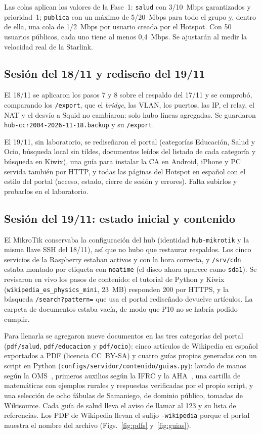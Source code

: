 \documentclass[conference]{IEEEtran}
\begin{document}
Las colas aplican los valores de la Fase~1: \texttt{salud} con 3/10~Mbps garantizados y prioridad~1; \texttt{publica} con un máximo de 5/20~Mbps para todo el grupo y, dentro de ella, una cola de 1/2~Mbps por usuario creada por el Hotspot. Con 50 usuarios públicos, cada uno tiene al menos 0,4~Mbps. Se ajustarán al medir la velocidad real de la Starlink.

\subsection{Sesión del 18/11 y rediseño del 19/11}
El 18/11 se aplicaron los pasos 7 y 8 sobre el respaldo del 17/11 y se comprobó, comparando los \texttt{/export}, que el \textit{bridge}, las VLAN, los puertos, las IP, el relay, el NAT y el desvío a Squid no cambiaron: solo hubo líneas agregadas. Se guardaron \texttt{hub-ccr2004-2026-11-18.backup} y su \texttt{/export}.

El 19/11, sin laboratorio, se rediseñaron el portal (categorías Educación, Salud y Ocio, búsqueda local sin tildes, documentos leídos del listado de cada categoría y búsqueda en Kiwix), una guía para instalar la CA en Android, iPhone y PC servida también por HTTP, y todas las páginas del Hotspot en español con el estilo del portal (acceso, estado, cierre de sesión y errores). Falta subirlos y probarlos en el laboratorio.

\subsection{Sesión del 19/11: estado inicial y contenido}
El MikroTik conservaba la configuración del hub (identidad \texttt{hub-mikrotik} y la misma llave SSH del 18/11), así que no hubo que restaurar respaldos. Los cinco servicios de la Raspberry estaban activos y con la hora correcta, y \texttt{/srv/cdn} estaba montado por etiqueta con \texttt{noatime} (el disco ahora aparece como \texttt{sda1}). Se revisaron en vivo los pasos de contenido: el tutorial de Python y Kiwix (\texttt{wikipedia\_es\_physics\_mini}, 23~MB) responden 200 por HTTPS, y la búsqueda \texttt{/search?pattern=} que usa el portal rediseñado devuelve artículos. La carpeta de documentos estaba vacía, de modo que P10 no se habría podido cumplir.

Para llenarla se agregaron nueve documentos en las tres categorías del portal (\texttt{pdf/salud}, \texttt{pdf/educacion} y \texttt{pdf/ocio}): cinco artículos de Wikipedia en español exportados a PDF (licencia CC~BY-SA) y cuatro guías propias generadas con un script en Python (\texttt{configs/servidor/contenido/guias.py}): lavado de manos según la OMS~\cite{who-hh}, primeros auxilios según la IFRC y la AHA~\cite{ifrc-fa}, una cartilla de matemáticas con ejemplos rurales y respuestas verificadas por el propio script, y una selección de ocho fábulas de Samaniego, de dominio público, tomadas de Wikisource. Cada guía de salud lleva el aviso de llamar al 123 y su lista de referencias. Los PDF de Wikipedia llevan el sufijo \texttt{-wikipedia} porque el portal muestra el nombre del archivo (Figs.~\ref{fig:pdfs} y~\ref{fig:guias}).
\end{document}
